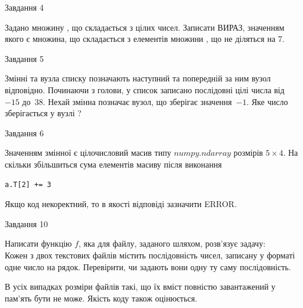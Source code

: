 \documentclass[12pt, ukrainian]{article}
\begin{document}
{               
{\begin{center}Завдання {4}\end{center}}
\vspace{-6mm}
Задано множину , що складається з цілих чисел. Записати ВИРАЗ, значенням якого є множина, що складається  з елементів множини , що не діляться на 7.\par

\vspace{10mm}
               
{\begin{center}Завдання {5}\end{center}}
\vspace{-6mm}
Змінні  та  вузла списку позначають наступний та попередній за ним вузол відповідно. Починаючи з голови, у список записано послідовні цілі числа від~$-15$ до~$38$. Нехай змінна  позначає вузол, що зберігає значення~$-1$.
Яке число зберігається у вузлі  ?\par

               
{\begin{center}Завдання {6}\end{center}}
\vspace{-6mm}
Значенням змінної  є цілочисловий масив типу $numpy.ndarray$ розмірів $5{\times}4$. На скільки збільшиться сума елементів масиву  після виконання
\begin{verbatim}
a.T[2] += 3
\end{verbatim}


Якщо код некоректний, то в якості відповіді зазначити ERROR.\par

               
{\begin{center}Завдання {10}\end{center}}
\vspace{-6mm}

Написати функцію $f$, яка для файлу, заданого шляхом, розв’язує задачу:\\ Кожен з двох текстових файлів містить послідовність чисел, записану у форматі одне число на рядок.  Перевірити, чи задають вони одну ту саму послідовність.

В усіх випадках розміри файлів такі, що їх вміст повністю завантажений у пам'ять бути не може. Якість коду також оцінюється.



\vspace{10mm}\par

}
\end{document}
